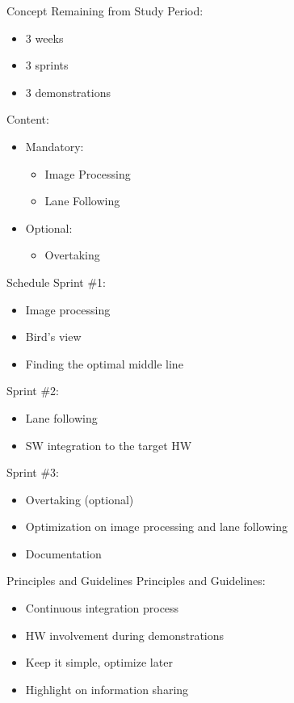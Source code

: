 \documentclass{beamer}
\begin{document}
\begin{frame}{Concept}
  Remaining from Study Period:
  \begin{itemize}
    \item 3 weeks
    \item 3 sprints
    \item 3 demonstrations
  \end{itemize}

  Content:
  \begin{itemize}
    \item Mandatory:
      \begin{itemize}
        \item Image Processing
        \item Lane Following
      \end{itemize}
    \item Optional:
      \begin{itemize}
        \item Overtaking
      \end{itemize}
  \end{itemize}
\end{frame}

\begin{frame}{Schedule}
  Sprint \#1:
  \begin{itemize}
    \item Image processing
    \item Bird's view
    \item Finding the optimal middle line
  \end{itemize}
  Sprint \#2:
  \begin{itemize}
    \item Lane following
    \item SW integration to the target HW
  \end{itemize}
  Sprint \#3:
  \begin{itemize}
    \item Overtaking (optional)
    \item Optimization on image processing and lane following
    \item Documentation
  \end{itemize}
\end{frame}

\begin{frame}{Principles and Guidelines}
  Principles and Guidelines:
  \begin{itemize}
    \item Continuous integration process
    \item HW involvement during demonstrations
    \item Keep it simple, optimize later
    \item Highlight on information sharing
  \end{itemize}
\end{frame}
\end{document}
